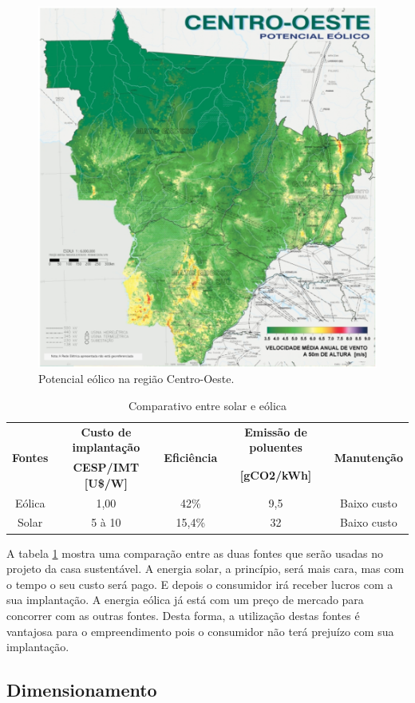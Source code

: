 \begin{figure}[H]
\centering
\includegraphics[width=.65\linewidth,keepaspectratio,angle=0]{figuras/potencial_centro_oeste.eps}
\caption{Potencial eólico na região Centro-Oeste.}
\label{potencial_centro_oeste}
\end{figure}


\begin{table}[H]
\centering
\begin{tabular}{|c|c|c|c|c|}
\hline 
\multirow{2}{*}{\textbf{Fontes}} & \textbf{Custo de implantação} & \multirow{2}{*}{\textbf{Eficiência}} & \textbf{Emissão de poluentes} & \multirow{2}{*}{\textbf{Manutenção}}\tabularnewline
 & \textbf{CESP/IMT {[}U\$/W{]}} &  & \textbf{{[}gCO2/kWh{]}} & \tabularnewline
\hline 
\hline 
Eólica & 1,00 & 42\% & 9,5 & Baixo custo\tabularnewline
\hline 
Solar & 5 à 10 & 15,4\% & 32 & Baixo custo\tabularnewline
\hline 
\end{tabular}
\caption{Comparativo entre solar e eólica}
\label{comparativo_solar_eolica}
\end{table}

A tabela \ref{comparativo_solar_eolica} mostra uma comparação entre as duas fontes que serão usadas no projeto da casa sustentável. A energia solar, a princípio, será mais cara, mas com o tempo o seu custo será pago. E depois o consumidor irá receber lucros com a sua implantação. A energia eólica já está com um preço de mercado para concorrer com as outras fontes. Desta forma, a utilização destas fontes é vantajosa para o empreendimento pois o consumidor não terá prejuízo com sua implantação.



\subsection{Dimensionamento}

